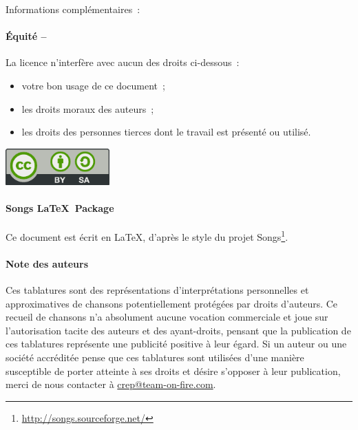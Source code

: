 {\begin{lblock}{Informations complémentaires~:}
{      \paragraph{Équité --}
      La licence n'interfère avec aucun des droits ci-dessous~:
      \begin{itemize}
      \item votre bon usage de ce document~;
      \item les droits moraux des auteurs~;
      \item les droits des personnes tierces dont le travail est
        présenté ou utilisé.
      \end{itemize}
    }

    \begin{center}
      \includegraphics[width=4cm]{license}
    \end{center}

  \end{lblock}
  \paragraph{Songs \LaTeX~Package}
  Ce document est écrit en \LaTeX, d'après le style du projet
  Songs\footnote{\url{http://songs.sourceforge.net/}}.

  \paragraph{Note des auteurs}
  Ces tablatures sont des représentations d'interprétations personnelles
  et approximatives de chansons potentiellement protégées par droits
  d'auteurs. Ce recueil de chansons n'a absolument aucune vocation
  commerciale et joue sur l'autorisation tacite des auteurs et des
  ayant-droits, pensant que la publication de ces tablatures représente
  une publicité positive à leur égard. Si un auteur ou une société
  accréditée pense que ces tablatures sont utilisées d'une manière
  susceptible de porter atteinte à ses droits et désire s'opposer à leur
  publication, merci de nous contacter à \url{crep@team-on-fire.com}.
}
